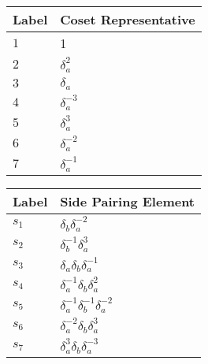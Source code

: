 \documentclass{article}
\begin{document}
\begin{center}
\begin{tabular}{ll}
\toprule
Label & Coset Representative\\
\midrule
$1$ & 1 \\
$2$ & $\delta_a^{2}$ \\
$3$ & $\delta_a^{}$ \\
$4$ & $\delta_a^{-3}$ \\
$5$ & $\delta_a^{3}$ \\
$6$ & $\delta_a^{-2}$ \\
$7$ & $\delta_a^{-1}$ \\
\bottomrule
\end{tabular}
\hfill
\begin{tabular}{ll}
\toprule
Label & Side Pairing Element\\
\midrule
$s_{1}$ & $\delta_b^{}\delta_a^{-2}$ \\
$s_{2}$ & $\delta_b^{-1}\delta_a^{3}$ \\
$s_{3}$ & $\delta_a^{}\delta_b^{}\delta_a^{-1}$ \\
$s_{4}$ & $\delta_a^{-1}\delta_b^{}\delta_a^{2}$ \\
$s_{5}$ & $\delta_a^{-1}\delta_b^{-1}\delta_a^{-2}$ \\
$s_{6}$ & $\delta_a^{-2}\delta_b^{}\delta_a^{3}$ \\
$s_{7}$ & $\delta_a^{3}\delta_b^{}\delta_a^{-3}$ \\
\bottomrule
\end{tabular}
\end{center}

\thispagestyle{empty}
\end{document}
